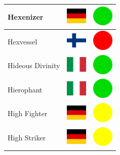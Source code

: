 \documentclass[12pt, a4paper, twoside]{report}
\begin{document}
\begin{center}
\begin{longtable}{|p{5cm}|p{2cm}|p{2cm}|}
 Hexenizer                                                  & \includegraphics[width=1cm]{../4x3/de} &   \includegraphics[width=1cm]{../likes/y} \\ \hline
 Hexvessel                                                  & \includegraphics[width=1cm]{../4x3/fi} &   \includegraphics[width=1cm]{../likes/n} \\ \hline
 Hideous Divinity                                           & \includegraphics[width=1cm]{../4x3/it} &   \includegraphics[width=1cm]{../likes/y} \\ \hline
 Hierophant                                                 & \includegraphics[width=1cm]{../4x3/it} &   \includegraphics[width=1cm]{../likes/y} \\ \hline
 High Fighter                                               & \includegraphics[width=1cm]{../4x3/de} &   \includegraphics[width=1cm]{../likes/m} \\ \hline
 High Striker                                               & \includegraphics[width=1cm]{../4x3/de} &   \includegraphics[width=1cm]{../likes/m} \\ \hline

\end{longtable}
\end{center}
\end{document}

